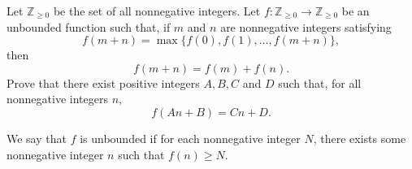 Let $\mathbb{Z}_{\geq 0}$ be the set of all nonnegative integers. Let $f:\mathbb{Z}_{\geq 0}\to\mathbb{Z}_{\geq 0}$ be an unbounded function such that, if $m$ and $n$ are nonnegative integers satisfying
\[
f(m+n)=\max\{f(0),f(1),\ldots,f(m+n)\},
\]
then
\[
f(m+n)=f(m)+f(n).
\]
Prove that there exist positive integers $A,B,C$ and $D$ such that, for all nonnegative integers $n$,
\[
f(An+B)=Cn+D.
\]

We say that $f$ is unbounded if for each nonnegative integer $N$, there exists some nonnegative integer $n$ such that $f(n)\geq N$.
